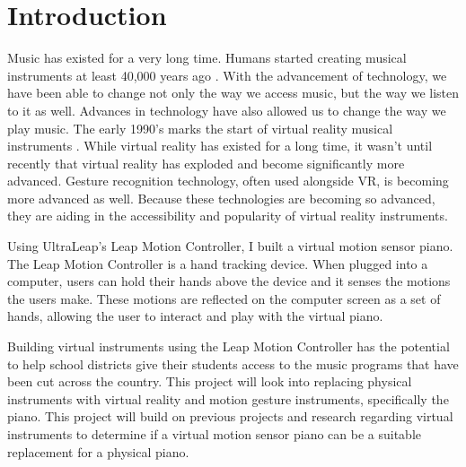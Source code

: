 \documentclass[sigconf,authordraft]{acmart}
\begin{document}


\maketitle

\section{Introduction}

Music has existed for a very long time.  Humans started creating musical instruments at least 40,000 years ago \cite{Smithsonian}.  With the advancement of technology, we have been able to change not only the way we access music, but the way we listen to it as well.  Advances in technology have also allowed us to change the way we play music.  The early 1990’s marks the start of virtual reality musical instruments \cite{swed_1994}.  While virtual reality has existed for a long time, it wasn’t until recently that virtual reality has exploded and become significantly more advanced.  Gesture recognition technology, often used alongside VR, is becoming more advanced as well.  Because these technologies are becoming so advanced, they are aiding in the accessibility and popularity of virtual reality instruments.

Using UltraLeap's Leap Motion Controller, I built a virtual motion sensor piano.  The Leap Motion Controller is a hand tracking device.  When plugged into a computer, users can hold their hands above the device and it senses the motions the users make.  These motions are reflected on the computer screen as a set of hands, allowing the user to interact and play with the virtual piano.

Building virtual instruments using the Leap Motion Controller has the potential to help school districts give their students access to the music programs that have been cut across the country.  This project will look into replacing physical instruments with virtual reality and motion gesture instruments, specifically the piano.  This project will build on previous projects and research regarding virtual instruments to determine if a virtual motion sensor piano can be a suitable replacement for a physical piano.
\end{document}
